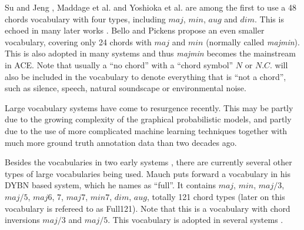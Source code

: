 Su and Jeng \cite{su2001multi}, Maddage et al. \cite{maddage2004content} and Yoshioka et al. \cite{yoshioka2004automatic} are among the first to use a 48 chords vocabulary with four types, including $maj$, $min$, $aug$ and $dim$. This is echoed in many later works \cite{harte2005automatic,catteau2007probabilistic,burgoyne2007cross,su2001multi,papadopoulos2008simultaneous}. Bello and Pickens \cite{bello2005robust} propose an even smaller vocabulary, covering only 24 chords with $maj$ and $min$ (normally called {\it majmin}). This is also adopted in many systems \cite{ryynanen2008automatic,weil2008hmm,khadkevich2009use,weller2009structured,ni2012end,cho2010exploring,humphrey2012rethinking} and thus \textit{majmin} becomes the mainstream in ACE. Note that usually a ``no chord'' with a ``chord symbol'' $N$ or $N.C.$ will also be included in the vocabulary to denote everything that is ``not a chord'', such as silence, speech, natural soundscape or environmental noise.

 \label{sec:2-largevocab}
Large vocabulary systems have come to resurgence recently. This may be partly due to the growing complexity of the graphical probabilistic models, and partly due to the use of more complicated machine learning techniques together with much more ground truth annotation data than two decades ago.


Besides the vocabularies in two early systems \cite{fujishima1999realtime,sheh2003chord}, there are currently several other types of large vocabularies being used. Mauch \cite{mauch2010automatic} puts forward a vocabulary in his DYBN based system, which he names as ``full''. It contains $maj$, $min$, $maj/3$, $maj/5$, $maj6$, $7$, $maj7$, $min7$, $dim$, $aug$, totally 121 chord types (later on this vocabulary is refereed to as Full121). Note that this is a vocabulary with chord inversions $maj/3$ and $maj/5$. This vocabulary is adopted in several systems \cite{ni2012end,mcvicar2014automatic,boulanger2013audio}.

